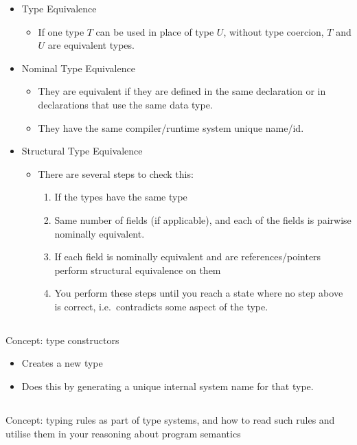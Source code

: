 \begin{itemize}
\item Type Equivalence
  \begin{itemize}[noitemsep]
  \item If one type $T$ can be used in place of type $U$, without type coercion, $T$ and $U$ are equivalent types.
  \end{itemize}

\item Nominal Type Equivalence
  \begin{itemize}[noitemsep]
  \item They are equivalent if they are defined in the same declaration or in declarations that use the same data type.
  \item They have the same compiler/runtime system unique name/id.
  \end{itemize}

\item Structural Type Equivalence
  \begin{itemize}[noitemsep]
  \item There are several steps to check this:
    \begin{enumerate}[noitemsep]
    \item If the types have the same type
    \item Same number of fields (if applicable), and each of the fields is pairwise nominally equivalent.
    \item If each field is nominally equivalent and are references/pointers perform structural equivalence on them
    \item You perform these steps until you reach a state where no step above is correct, i.e.\ contradicts some aspect of the type.
    \end{enumerate}
  \end{itemize}
\end{itemize}

\subsection{}
Concept: type constructors

\begin{itemize}[noitemsep]
\item Creates a new type
\item Does this by generating a unique internal system name for that type.
\end{itemize}

\subsection{}
Concept: typing rules as part of type systems, and how to read such rules and utilise them in your reasoning about program semantics

